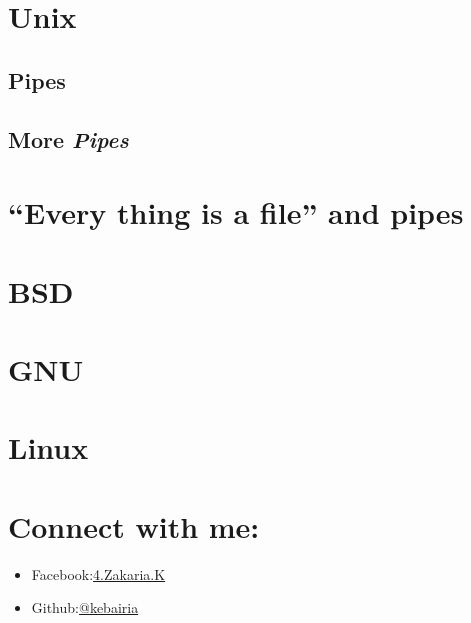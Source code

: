 \documentclass[11pt]{article}
\begin{document}
\section*{Unix}
\label{sec:org47c2c68}
\subsection*{Pipes}
\label{sec:orgddf07d4}
\subsection*{More \emph{Pipes}}
\label{sec:org527dad5}
\section*{“Every thing is a file” and pipes}
\label{sec:org89776d2}
\section*{BSD}
\label{sec:org3fe87c6}
\section*{GNU}
\label{sec:org58fad73}

\section*{Linux}
\label{sec:orgc6530a7}

\section*{Connect with me:}
\label{sec:org18155b3}
\begin{itemize}
\item Facebook:\href{https:www.facebook.com/4.Zakaria.K}{4.Zakaria.K}
\item Github:\href{https:www.github.com/kebairia}{@kebairia}
\end{itemize}
\end{document}
